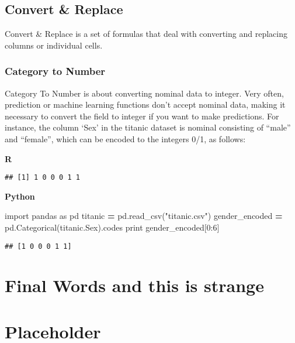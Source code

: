 \documentclass[12pt,]{book}
\newenvironment{Shaded}{\begin{snugshade}}{\end{snugshade}}
\newcommand{\KeywordTok}[1]{\textcolor[rgb]{0.13,0.29,0.53}{\textbf{#1}}}
\newcommand{\DecValTok}[1]{\textcolor[rgb]{0.00,0.00,0.81}{#1}}
\newcommand{\StringTok}[1]{\textcolor[rgb]{0.31,0.60,0.02}{#1}}
\newcommand{\ImportTok}[1]{#1}
\newcommand{\CommentTok}[1]{\textcolor[rgb]{0.56,0.35,0.01}{\textit{#1}}}
\newcommand{\OperatorTok}[1]{\textcolor[rgb]{0.81,0.36,0.00}{\textbf{#1}}}
\newcommand{\BuiltInTok}[1]{#1}
\newcommand{\NormalTok}[1]{#1}
\theoremstyle{definition}
\theoremstyle{definition}
\theoremstyle{definition}
\theoremstyle{remark}
\begin{document}
\section{Convert \& Replace}\label{convert-replace}

Convert \& Replace is a set of formulas that deal with converting and
replacing columns or individual cells.

\subsection{Category to Number}\label{category-to-number}

Category To Number is about converting nominal data to integer. Very
often, prediction or machine learning functions don't accept nominal
data, making it necessary to convert the field to integer if you want to
make predictions. For instance, the column `Sex' in the titanic dataset
is nominal consisting of ``male'' and ``female'', which can be encoded
to the integers 0/1, as follows:

\textbf{R}

\begin{Shaded}
\end{Shaded}

\begin{verbatim}
## [1] 1 0 0 0 1 1
\end{verbatim}

\textbf{Python}

\begin{Shaded}
\begin{Highlighting}[]
\ImportTok{import}\NormalTok{ pandas }\ImportTok{as}\NormalTok{ pd}
\NormalTok{titanic }\OperatorTok{=}\NormalTok{ pd.read_csv(}\StringTok{"titanic.csv"}\NormalTok{)}
\NormalTok{gender_encoded }\OperatorTok{=}\NormalTok{   pd.Categorical(titanic.Sex).codes }
\BuiltInTok{print}\NormalTok{ gender_encoded[}\DecValTok{0}\NormalTok{:}\DecValTok{6}\NormalTok{]}
\end{Highlighting}
\end{Shaded}

\begin{verbatim}
## [1 0 0 0 1 1]
\end{verbatim}

\chapter{Final Words and this is
strange}\label{final-words-and-this-is-strange}

\chapter{Placeholder}\label{placeholder}


\end{document}
